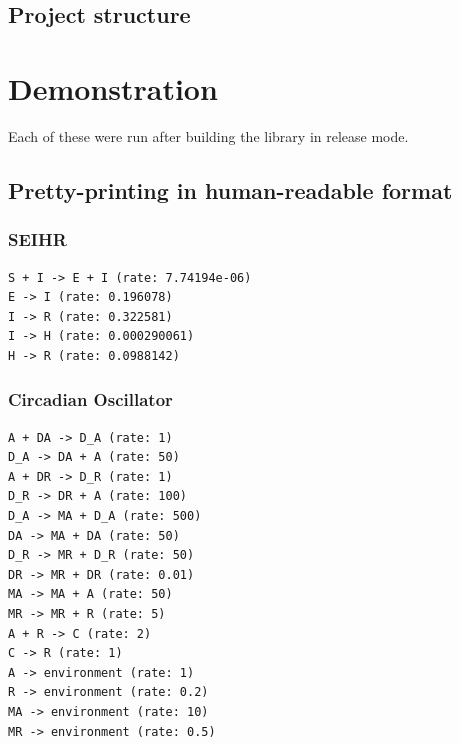 \subsection{Project structure}

\section{Demonstration}
Each of these were run after building the library in release mode.

\subsection{Pretty-printing in human-readable format}
\subsubsection{SEIHR}
\begin{verbatim}
S + I -> E + I (rate: 7.74194e-06)
E -> I (rate: 0.196078)
I -> R (rate: 0.322581)
I -> H (rate: 0.000290061)
H -> R (rate: 0.0988142)
\end{verbatim}

\subsubsection{Circadian Oscillator}
\begin{verbatim}
A + DA -> D_A (rate: 1)
D_A -> DA + A (rate: 50)
A + DR -> D_R (rate: 1)
D_R -> DR + A (rate: 100)
D_A -> MA + D_A (rate: 500)
DA -> MA + DA (rate: 50)
D_R -> MR + D_R (rate: 50)
DR -> MR + DR (rate: 0.01)
MA -> MA + A (rate: 50)
MR -> MR + R (rate: 5)
A + R -> C (rate: 2)
C -> R (rate: 1)
A -> environment (rate: 1)
R -> environment (rate: 0.2)
MA -> environment (rate: 10)
MR -> environment (rate: 0.5)
\end{verbatim}

